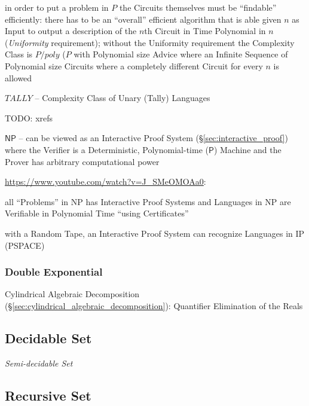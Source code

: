 in order to put a problem in $P$ the Circuits themselves must be ``findable''
efficiently: there has to be an ``overall'' efficient algorithm that is able
given $n$ as Input to output a description of the $n$th Circuit in Time
Polynomial in $n$ (\emph{Uniformity} requirement); without the Uniformity
requirement the Complexity Class is $P/poly$ ($P$ with Polynomial size Advice
where an Infinite Sequence of Polynomial size Circuits where a completely
different Circuit for every $n$ is allowed

$TALLY$ -- Complexity Class of Unary (Tally) Languages

TODO: xrefs

$\mathsf{NP}$ -- can be viewed as an Interactive Proof System
(\S\ref{sec:interactive_proof}) where the Verifier is a Deterministic,
Polynomial-time ($\mathsf{P}$) Machine and the Prover has arbitrary
computational power

\url{https://www.youtube.com/watch?v=J_SMeOMOAa0}:

all ``Problems'' in NP has Interactive Proof Systems and Languages in NP are
Verifiable in Polynomial Time ``using Certificates''

with a Random Tape, an Interactive Proof System can recognize Languages in IP
(PSPACE)



\subsubsection{Double Exponential}\label{sec:double_exponential}

Cylindrical Algebraic Decomposition
(\S\ref{sec:cylindrical_algebraic_decomposition}): Quantifier Elimination of
the Reals



\subsection{Decidable Set}\label{sec:decidable_set}

\emph{Semi-decidable Set}



\subsection{Recursive Set}\label{sec:recursive_set}

